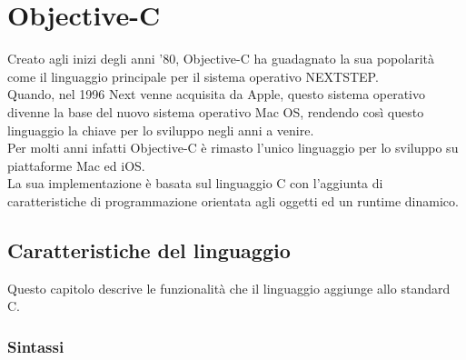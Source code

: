 \chapter{Objective-C}
Creato agli inizi degli anni '80, Objective-C ha guadagnato la sua popolarità come il linguaggio principale per il sistema operativo NEXTSTEP.\\
Quando, nel 1996 Next venne acquisita da Apple, questo sistema operativo divenne la base del nuovo sistema operativo Mac OS, rendendo così questo linguaggio la chiave per lo sviluppo negli anni a venire.\\
Per molti anni infatti Objective-C è rimasto l'unico linguaggio per lo sviluppo su piattaforme Mac ed iOS.\\
La sua implementazione è basata sul linguaggio C con l'aggiunta di caratteristiche di programmazione orientata agli oggetti ed un runtime dinamico.
\section{Caratteristiche del linguaggio}
Questo capitolo descrive le funzionalità che il linguaggio aggiunge allo standard C. 
\subsection{Sintassi}
